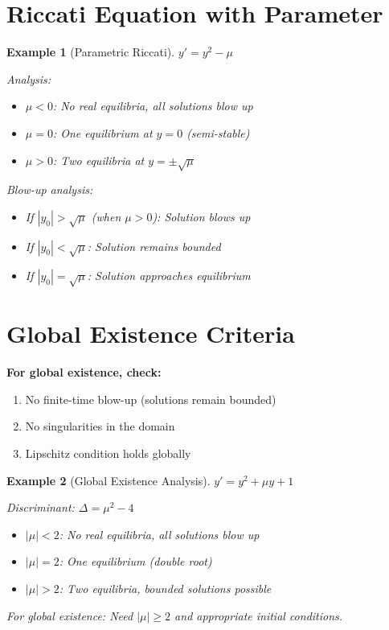 \documentclass[12pt]{article}
\newtheorem{example}{Example}
\begin{document}
\section{Riccati Equation with Parameter}

\begin{example}[Parametric Riccati]
$y' = y^2 - \mu$

Analysis:
\begin{itemize}
    \item $\mu < 0$: No real equilibria, all solutions blow up
    \item $\mu = 0$: One equilibrium at $y = 0$ (semi-stable)
    \item $\mu > 0$: Two equilibria at $y = \pm\sqrt{\mu}$
\end{itemize}

Blow-up analysis:
\begin{itemize}
    \item If $|y_0| > \sqrt{\mu}$ (when $\mu > 0$): Solution blows up
    \item If $|y_0| < \sqrt{\mu}$: Solution remains bounded
    \item If $|y_0| = \sqrt{\mu}$: Solution approaches equilibrium
\end{itemize}
\end{example}

\section{Global Existence Criteria}

\begin{insight}
\textbf{For global existence, check:}
\begin{enumerate}
    \item No finite-time blow-up (solutions remain bounded)
    \item No singularities in the domain
    \item Lipschitz condition holds globally
\end{enumerate}
\end{insight}

\begin{example}[Global Existence Analysis]
$y' = y^2 + \mu y + 1$

Discriminant: $\Delta = \mu^2 - 4$

\begin{itemize}
    \item $|\mu| < 2$: No real equilibria, all solutions blow up
    \item $|\mu| = 2$: One equilibrium (double root)
    \item $|\mu| > 2$: Two equilibria, bounded solutions possible
\end{itemize}

For global existence: Need $|\mu| \geq 2$ and appropriate initial conditions.
\end{example}
\end{document}
